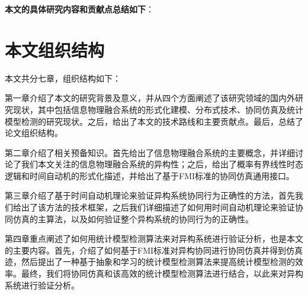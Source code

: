 \textbf{本文的具体研究内容和贡献点总结如下}：

\section{本文组织结构}
本文共分七章，组织结构如下：

第一章介绍了本文的研究背景及意义，并从四个方面阐述了该研究领域的国内外研究现状，其中包括信息物理融合系统的形式化建模、分布式技术、协同仿真及统计模型检测的研究现状。之后，给出了本文的技术路线和主要贡献点。最后，总结了论文组织结构。

第二章介绍了相关预备知识。首先给出了信息物理融合系统的主要概念，并详细讨论了我们本文关注的信息物理融合系统的异构性；之后，给出了概率有界线性时态逻辑和时间自动机的形式化描述，并给出了基于FMI标准的协同仿真通用接口。

第三章介绍了基于时间自动机理论来验证异构系统协同行为正确性的方法，首先我们给出了该方法的技术框架，之后我们详细描述了如何用时间自动机理论来验证协同仿真的主算法，以及如何验证整个异构系统的协同行为的正确性。

第四章重点阐述了如何用统计模型检测算法来对异构系统进行验证分析，也是本文的主要内容。首先，介绍了如何基于FMI标准对异构协同进行协同仿真并得到仿真迹，然后提出了一种基于抽象和学习的统计模型检测算法来提高统计模型检测的效率。最终，我们将协同仿真和该高效的统计模型检测算法进行结合，以此来对异构系统进行验证分析。

